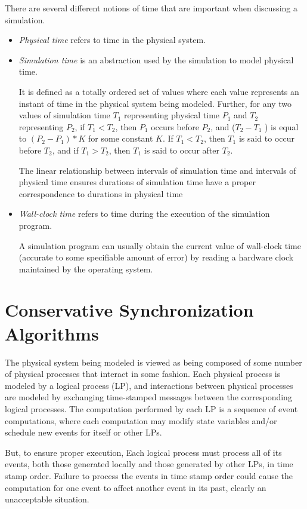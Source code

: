 \documentclass[12pt,a4paper]{article}
\begin{document}
	There are several different notions of time that are important when discussing a simulation.
	\begin{itemize}
	\item \emph{Physical time} refers to time in the physical system.
	\item \emph{Simulation time} is an abstraction used by the simulation to model physical time.
	
	It is defined as a totally ordered set of values where each value represents an instant of time in the physical system being modeled. Further, for any two values of simulation time $T_1$ representing physical time $P_1$ and $T_2$ representing $P_2$, if $T_1 < T_2$, then $P_1$ occurs before $P_2$, and ($T_2 - T_1$ ) is equal to $(P_2 - P_1) * K$ for some constant $K$. If $T_1 < T_2$, then $T_1$ is said to occur before $T_2$, and if $T_1 > T_2$, then $T_1$ is said to occur after $T_2$. 
	
	The linear relationship between intervals of simulation time and intervals of physical time ensures durations of simulation time have a proper correspondence to durations in physical time
	\item \emph{Wall-clock time} refers to time during the execution of the simulation program.
	
	A simulation program can usually obtain the current value of wall-clock time (accurate to some specifiable amount of error) by reading a hardware clock maintained by the operating system.
	\end{itemize}


\section{Conservative Synchronization Algorithms}
	The physical system being modeled is viewed as being composed of some number of physical processes that interact in some fashion. Each physical process is modeled by a logical process (LP), and interactions between physical processes are modeled by exchanging time-stamped messages between the corresponding logical processes. The computation performed by each LP is a sequence of event computations, where each computation may modify state variables and/or schedule new events for itself or other LPs.
	
	But, to ensure proper execution, Each logical process must process all of its events, both those generated locally and those
generated by other LPs, in time stamp order. Failure to process the events in time stamp order could cause the computation for one event to affect another event in its past, clearly an unacceptable situation.
\end{document}
